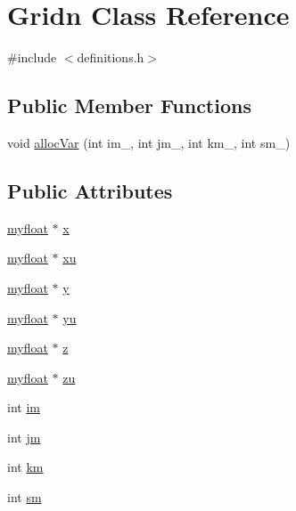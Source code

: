 \hypertarget{classGridn}{}\section{Gridn Class Reference}
\label{classGridn}


{\ttfamily \#include $<$definitions.\+h$>$}

\subsection*{Public Member Functions}
\begin{DoxyCompactItemize}
\item 
void \hyperlink{classGridn_ae1ef7a5ab30431e0c539489d0565f178}{alloc\+Var} (int im\+\_\+, int jm\+\_\+, int km\+\_\+, int sm\+\_\+)
\end{DoxyCompactItemize}
\subsection*{Public Attributes}
\begin{DoxyCompactItemize}
\item 
\hyperlink{param_8h_a5f097c9f3873af7be7fc156e6a06ca5e}{myfloat} $\ast$ \hyperlink{classGridn_a6eb42b648c9604f2c0a9e1da594ac853}{x}
\item 
\hyperlink{param_8h_a5f097c9f3873af7be7fc156e6a06ca5e}{myfloat} $\ast$ \hyperlink{classGridn_aec52f4846ea1129583b2d6bc25f3f882}{xu}
\item 
\hyperlink{param_8h_a5f097c9f3873af7be7fc156e6a06ca5e}{myfloat} $\ast$ \hyperlink{classGridn_a5a2253ef195c3fc22d1191845b55f5a5}{y}
\item 
\hyperlink{param_8h_a5f097c9f3873af7be7fc156e6a06ca5e}{myfloat} $\ast$ \hyperlink{classGridn_adbe5bab4b6041d5b0b4bbd1024412dd0}{yu}
\item 
\hyperlink{param_8h_a5f097c9f3873af7be7fc156e6a06ca5e}{myfloat} $\ast$ \hyperlink{classGridn_a4a12b2ba2ddd162c2d93b9ced2fef7c4}{z}
\item 
\hyperlink{param_8h_a5f097c9f3873af7be7fc156e6a06ca5e}{myfloat} $\ast$ \hyperlink{classGridn_a1116eb6bd06272d2ba159feda86c712c}{zu}
\item 
int \hyperlink{classGridn_afd5aa77aff1bef012c5e0bc483773d43}{im}
\item 
int \hyperlink{classGridn_a9cb3b596b2e1476c649192bed9bedb20}{jm}
\item 
int \hyperlink{classGridn_a26254c9540eed90dc8a91b668f095895}{km}
\item 
int \hyperlink{classGridn_a4f499d2d9d08951ab43b2538d12fe527}{sm}
\end{DoxyCompactItemize}


